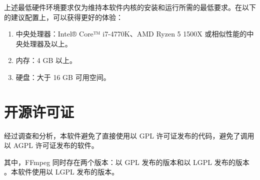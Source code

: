 上述最低硬件环境要求仅为维持本软件内核的安装和运行所需的最低要求。在以下的建议配置上，可以获得更好的体验：

\begin{enumerate}
    \item 中央处理器：Intel® Core™ i7-4770K、AMD Ryzen 5 1500X 或相似性能的中央处理器及以上。
    \item 内存：4 GB 以上。
    \item 硬盘：大于 16 GB 可用空间。
\end{enumerate}

\section{开源许可证}

经过调查和分析，本软件避免了直接使用以 GPL 许可证发布的代码，避免了调用以 AGPL 许可证发布的软件。

其中，FFmpeg 同时存在两个版本：以 GPL 发布的版本和以 LGPL 发布的版本 \cite{ffmpeg_doc}。本软件使用以 LGPL 发布的版本。
